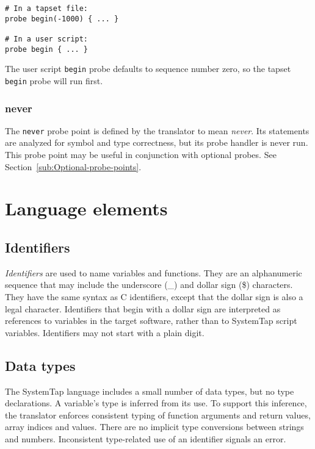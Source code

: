 \documentclass[twoside,english]{article}
\newenvironment{vindent}
{\begin{list}{}{\setlength{\listparindent}{6pt}}
\item[]}
{\end{list}}
\begin{document}
\begin{vindent}
\begin{verbatim}
# In a tapset file:
probe begin(-1000) { ... }

# In a user script:
probe begin { ... }
\end{verbatim}
\end{vindent}
The user script \texttt{begin} probe defaults to sequence number zero, so
the tapset \texttt{begin} probe will run first.


\subsubsection{never}
The \texttt{never} probe point is defined by the translator to mean \emph{never}.
Its statements are analyzed for symbol and type correctness, but its probe
handler is never run. This probe point may be useful in conjunction with
optional probes. See Section~\ref{sub:Optional-probe-points}.


\section{Language elements\label{sec:Language-Elements}}
\subsection{Identifiers}
\emph{Identifiers} are used to name variables and functions. They are an
alphanumeric sequence that may include the underscore (\_) and dollar sign
(\$) characters. They have the same syntax as C identifiers, except that
the dollar sign is also a legal character. Identifiers that begin with a
dollar sign are interpreted as references to variables in the target software,
rather than to SystemTap script variables. Identifiers may not start with
a plain digit.


\subsection{Data types\label{sub:Data-types}}
The SystemTap language includes a small number of data types, but no type
declarations. A variable's type is inferred from its use.
To support this inference, the translator enforces consistent typing of function
arguments and return values, array indices and values. There are no implicit
type conversions between strings and numbers. Inconsistent type-related use
of an identifier signals an error.
\end{document}
